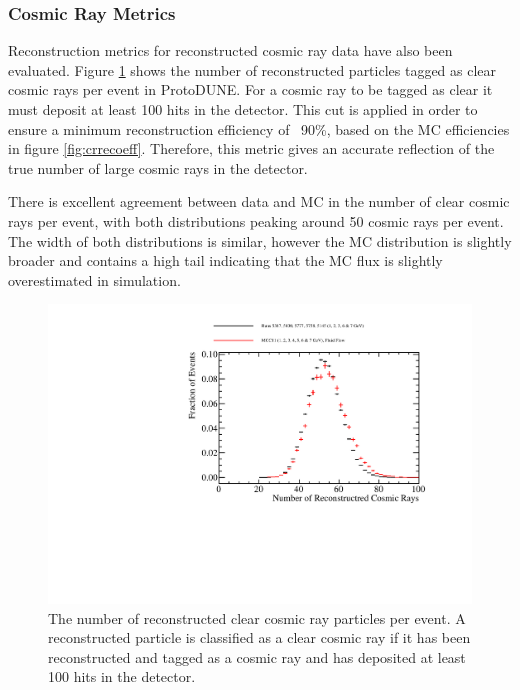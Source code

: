 \subsubsection{Cosmic Ray Metrics}

Reconstruction metrics for reconstructed cosmic ray data have also been evaluated.  Figure \ref{fig:ncrdata} shows the number of reconstructed particles tagged as clear cosmic rays per event in ProtoDUNE.  For a cosmic ray to be tagged as clear it must deposit at least 100 hits in the detector.  This cut is applied in order to ensure a minimum reconstruction efficiency of ~90\%, based on the MC efficiencies in figure \ref{fig:crrecoeff}.  Therefore, this metric gives an accurate reflection of the true number of large cosmic rays in the detector.  

There is excellent agreement between data and MC in the number of clear cosmic rays per event, with both distributions peaking around 50 cosmic rays per event.  The width of both distributions is similar, however the MC distribution is slightly broader and contains a high tail indicating that the MC flux is slightly overestimated in simulation.  

\begin{figure}
\includegraphics[width=1.0\textwidth]{Figures/Metrics/Data/Cosmics/NumberofReconstructedCosmicRays.pdf}
\caption{The number of reconstructed clear cosmic ray particles per event.  A reconstructed particle is classified as a clear cosmic ray if it has been reconstructed and tagged as a cosmic ray and has deposited at least 100 hits in the detector.}
\label{fig:ncrdata}
\end{figure}

